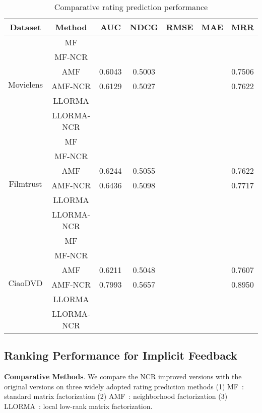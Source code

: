 \documentclass[letterpaper]{article} %
\begin{document}
\begin{table}[htp]
\tiny
\caption{Comparative rating prediction performance}
\begin{center}
\begin{tabular}{|c|c|c|c|c|c|c|}
\hline
Dataset & Method & AUC & NDCG & RMSE & MAE & MRR \\\hline
\multirow{6}{*}{Movielens} & MF & & & & & \\\cline{2-7}
 & MF-NCR & & & & & \\\cline{2-7}
 & AMF &0.6043 &0.5003 & & &0.7506 \\\cline{2-7}
 & AMF-NCR &0.6129 &0.5027 & & &0.7622 \\\cline{2-7}
 & LLORMA & & & & & \\\cline{2-7}
 & LLORMA-NCR & & & & & \\\hline
\multirow{6}{*}{Filmtrust} & MF & & & & & \\\cline{2-7}
 & MF-NCR & & & & & \\\cline{2-7}
 & AMF &0.6244 &0.5055 & & &0.7622 \\\cline{2-7}
 & AMF-NCR &0.6436 &0.5098 & & &0.7717 \\\cline{2-7}
 & LLORMA & & & & & \\\cline{2-7}
 & LLORMA-NCR & & & & & \\\hline
 \multirow{6}{*}{CiaoDVD} & MF & & & & & \\\cline{2-7}
 & MF-NCR & & & & & \\\cline{2-7}
 & AMF &0.6211 &0.5048 & & &0.7607\\\cline{2-7}
 & AMF-NCR &0.7993 &0.5657 & & &0.8950 \\\cline{2-7}
 & LLORMA & & & & & \\\cline{2-7}
 & LLORMA-NCR & & & & & \\\hline
\end{tabular}
\end{center}
\label{tab:ratingresult}
\end{table}%

\subsection{Ranking Performance for Implicit Feedback}

\textbf{Comparative Methods}. We compare the NCR improved versions with the original versions on three widely adopted rating prediction methods (1) MF~\cite{Koren2009Matrix}: standard matrix factorization  (2) AMF~\cite{Koren2008Factorization}: neighborhood factorization (3) LLORMA~\cite{Lee2013Local}: local low-rank matrix factorization. 
\end{document}
